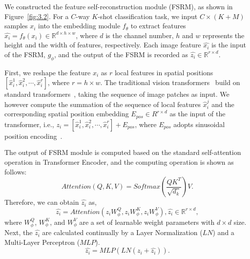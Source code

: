 \documentclass[letterpaper]{article} %
\begin{document}
We constructed the feature self-reconstruction module (FSRM), as shown in Figure~\ref{fig:3.2}. For a $C$-way $K$-shot classification task, we input $C \times (K+M)$ samples $x_i$ into the embedding module $f_{\theta}$ to extract features $\hat{x_i} = f_\theta(x_i) \in \mathbb{R}^{d\times h \times w}$, where $d$ is the channel number, $h$ and $w$ represents the height and the width of features, respectively.
Each image feature $\hat{x_i}$ is the input of the FSRM, $g_{\phi}$, and the output of the FSRM is recorded as ${\hat{z_i}} \in \mathbb{R}^{r \times d}$.

First, we reshape the feature $\hat{x_i}$ as $r$ local features in spatial positions $[\hat{x}_i^1, \hat{x}_i^2, \cdots, \hat{x}_i^{r}]$, where $r=h\times w$. The traditional vision transformers~\cite{dosovitskiy2021an} build on standard transformers~\cite{NIPS2017_3f5ee243}, taking the sequence of image patches as input. We {however} compute the summation of the sequence of local features $\hat{x}_i^{j}$ and the corresponding spatial position embedding $E_{pos} \in R^{r \times d}$ as the input of the transformer, i.e.,
  ${z_i} = [\hat{x}_i^1, \hat{x}_i^2, \cdots, \hat{x}_i^{r}] + E_{pos}$,
where $E_{pos}$ adopts sinusoidal position encoding~\cite{NIPS2017_3f5ee243}.

The output of FSRM module is computed based on the standard self-attention operation in Transformer Encoder, and the computing operation is shown as follows:
\begin{equation}
  Attention(Q, K, V) = Softmax(\frac{QK^T}{\sqrt{d_k}})V.
  \label{equ:2}
\end{equation}
Therefore, we can obtain $\hat{z_i}$ as,
\begin{equation}
  \hat{z_i} = Attention(z_i W_{\phi}^Q, z_i W_{\phi}^K, z_i W_{\phi}^V), \hat{z_i} \in \mathbb{R}^{r\times d},
\end{equation}
where $W_{\phi}^Q$, $W_{\phi}^K$, and $W_{\phi}^V$ are a set of learnable weight parameters with $d\times d$ size. Next, the $\hat{z_i}$ are calculated continually by a Layer Normalization ($LN$) and a Multi-Layer Perceptron ($MLP$).
\begin{equation}
  \hat{z_i} = MLP(LN(z_i + \hat{z_i})).
\end{equation}
\end{document}
